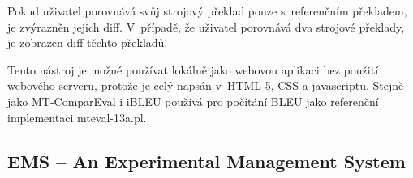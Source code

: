 Pokud uživatel porovnává svůj strojový překlad pouze s~referenčním překladem,
  je zvýrazněn jejich diff.
V~případě, že uživatel porovnává dva strojové překlady,
  je zobrazen diff těchto překladů.

Tento nástroj je možné používat lokálně jako webovou aplikaci bez použití webového serveru,
  protože je celý napsán v~HTML 5, CSS a javascriptu.
Stejně jako MT-ComparEval i iBLEU používá pro počítání BLEU jako referenční implementaci mteval-13a.pl.

\subsection{EMS -- An Experimental Management System}
